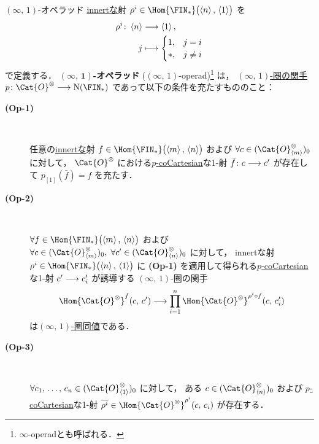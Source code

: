 \documentclass[TQFT_main]{subfiles}
\begin{document}
\begin{mydef}[label=def:infty-operad]{{$(\infty,\, 1)$}-オペラッド}
    \hyperref[def:innert-active]{innertな}射 $\rho^i \in \Hom{\FIN_*}\bigl( \expval{n},\, \expval{1} \bigr)$ を
    \begin{align}
        \rho^i \colon \expval{n} &\longrightarrow \expval{1}, \\
        j &\longmapsto \begin{cases}
            1, &j=i \\
            *, &j\neq i
        \end{cases}
    \end{align}
    で定義する．
    $\bm{(\infty,\, 1)}$\textbf{-オペラッド} ($(\infty,\, 1)$-operad)\footnote{$\infty$-operadとも呼ばれる．} は，
    \hyperref[def:infinity-1]{$(\infty,\, 1)$-圏の関手} $p \colon \Cat{O}^{\otimes} \lto \mathrm{N}(\FIN_*)$ であって以下の条件を充たすもののこと：
    \begin{description}
        \item[\textbf{(Op-1)}]　
        
        任意の\hyperref[def:innert-active]{innertな}射 $f \in \Hom{\FIN_*} \bigl( \expval{m},\, \expval{n} \bigr)$ および $\forall c \in (\Cat{O}^\otimes_{\expval{m}})_0$ に対して，
        $\Cat{O}^\otimes$ における\hyperref[def:Cart-coCart]{$p$-coCartesian}な1-射 $\bar{f} \colon c \longrightarrow c'$ が存在して $p_{[1]}(\bar{f}) = f$ を充たす．
        
        \item[\textbf{(Op-2)}]　
        
        $\forall f \in \Hom{\FIN_*} \bigl( \expval{m},\, \expval{n} \bigr)$ および $\forall c \in (\Cat{O}^\otimes_{\expval{m}})_0,\; \forall c' \in (\Cat{O}^\otimes_{\expval{n}})_0$ に対して，
        innertな射 $\rho^i \in  \Hom{\FIN_*}\bigl( \expval{n},\, \expval{1} \bigr)$ に \textsf{\textbf{(Op-1)}} を適用して得られる\hyperref[def:Cart-coCart]{$p$-coCartesian}な1-射 $c' \longrightarrow c'_i$ が誘導する $(\infty,\, 1)$-圏の関手
        \begin{align}
            \Hom{\Cat{O}^\otimes}^f (c,\, c') \lto \prod_{i=1}^n \Hom{\Cat{O}^\otimes}^{\rho^i \circ f} (c,\, c'_i)
        \end{align}
        は\hyperref[def:equiv-infty]{$(\infty,\, 1)$-圏同値}である．

        \item[\textbf{(Op-3)}]　
        
        $\forall c_1,\, \dots,\, c_n \in (\Cat{O}^\otimes_{\expval{1}})_0$ に対して，
        ある $c \in (\Cat{O}^\otimes_{\expval{n}})_0$ および \hyperref[def:Cart-coCart]{$p$-coCartesian}な1-射 $\overline{\rho^i} \in \Hom{\Cat{O}^\otimes}^{\rho^i} (c,\, c_i)$ が存在する．
    \end{description}
\end{mydef}
\end{document}
